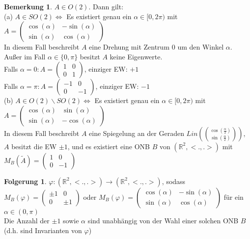 \documentclass[10pt,a4paper,numbers=endperiod]{scrartcl}
\theoremstyle{definition}
\newtheorem{bem}[satz]{Bemerkung}
\newtheorem{folg}[satz]{Folgerung}
\def\RR{{\mathbb R}}
\begin{document}
\begin{bem}
	$A \in O(2)$. Dann gilt:\\
	(a) $A \in SO(2) \Leftrightarrow$ Es existiert genau ein $\alpha \in [0, 2\pi)$ mit\\
	$A = \begin{pmatrix}
	\cos(\alpha) & -\sin(\alpha)\\
	\sin(\alpha) & \cos(\alpha)
	\end{pmatrix}$\\
	In diesem Fall beschreibt $A$ eine Drehung mit Zentrum $0$ um den Winkel $\alpha$.\\
	Außer im Fall $\alpha \in \{0, \pi\}$ besitzt $A$ keine Eigenwerte.\\
	Falls $\alpha = 0: A = \begin{pmatrix}
	1 & 0\\
	0 & 1
	\end{pmatrix}$, einziger EW: $+1$\\
	Falls $\alpha = \pi: A = \begin{pmatrix}
	-1 & 0\\
	0 & -1
	\end{pmatrix}$, einziger EW: $-1$\\
	(b) $A \in O(2) \backslash SO(2) \Leftrightarrow$ Es existiert genau ein $\alpha \in [0, 2\pi)$ mit\\
	$A = \begin{pmatrix}
	\cos (\alpha) & \sin (\alpha)\\
	\sin (\alpha) & -\cos(\alpha)
	\end{pmatrix}$\\
	In diesem Fall beschreibt $A$ eine Spiegelung an der Geraden $Lin(\binom{\cos(\frac{\alpha}{2})}{\sin (\frac{\alpha}{2})})$, 
	$A$ besitzt die EW $\pm 1$, und es existiert eine ONB $B$ von $(\RR^2, <.,.>)$ mit $M_B(\tilde{A}) = \begin{pmatrix}
	1 & 0\\
	0 & -1
	\end{pmatrix}$ 
\end{bem}

\begin{folg}
	$\varphi: (\RR^2, <.,.>) \rightarrow (\RR^2, <.,.>)$, sodass $M_B(\varphi) = \begin{pmatrix}
	\pm1 & 0\\
	0 & \pm1
	\end{pmatrix}$ oder $M_B (\varphi) = \begin{pmatrix}
	\cos (\alpha) & -\sin (\alpha)\\
	\sin (\alpha) & \cos(\alpha)
	\end{pmatrix}$ für ein $\alpha \in (0, \pi)$\\
	Die Anzahl der $\pm1$ sowie $\alpha$ sind unabhängig von der Wahl einer solchen ONB $B$ (d.h. sind Invarianten von $\varphi$)
\end{folg}
\end{document}
